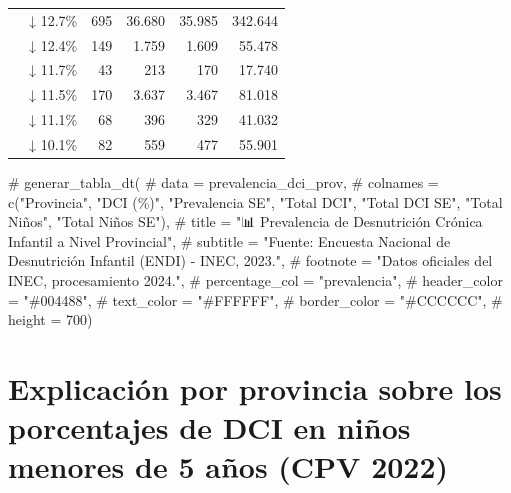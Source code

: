 \documentclass[
  letterpaper,
  DIV=11,
  numbers=noendperiod]{scrreprt}
\newenvironment{Shaded}{\begin{snugshade}}{\end{snugshade}}
\newcommand{\CommentTok}[1]{\textcolor[rgb]{0.37,0.37,0.37}{#1}}
\begin{document}
\begin{table}
\begin{tabular*}{\linewidth}{@{\extracolsep{\fill}}lrrrrr}
{\cellcolor[HTML]{E0F7FA}{GUAYAS}} & ↓ 12.7\% & 695 & 36.680 & 35.985 & 342.644 \\ 
{\cellcolor[HTML]{E0F7FA}{ESMERALDAS}} & ↓ 12.4\% & 149 & 1.759 & 1.609 & 55.478 \\ 
{\cellcolor[HTML]{E0F7FA}{SUCUMBÍOS}} & ↓ 11.7\% & 43 & 213 & 170 & 17.740 \\ 
{\cellcolor[HTML]{E0F7FA}{LOS RÍOS}} & ↓ 11.5\% & 170 & 3.637 & 3.467 & 81.018 \\ 
{\cellcolor[HTML]{E0F7FA}{SANTO DOMINGO DE LOS TSÁCHILAS}} & ↓ 11.1\% & 68 & 396 & 329 & 41.032 \\ 
{\cellcolor[HTML]{E0F7FA}{EL ORO}} & ↓ 10.1\% & 82 & 559 & 477 & 55.901 \\ 
\bottomrule
\end{tabular*}
\end{table}

\begin{Shaded}
\begin{Highlighting}[]
\CommentTok{\# generar\_tabla\_dt(}
\CommentTok{\#   data = prevalencia\_dci\_prov,}
\CommentTok{\#   colnames = c("Provincia", "DCI (\%)", "Prevalencia SE", "Total DCI", "Total DCI SE", "Total Niños", "Total Niños SE"),}
\CommentTok{\#   title = "📊 Prevalencia de Desnutrición Crónica Infantil a Nivel Provincial",}
\CommentTok{\#   subtitle = "Fuente: Encuesta Nacional de Desnutrición Infantil (ENDI) {-} INEC, 2023.",}
\CommentTok{\#   footnote = "Datos oficiales del INEC, procesamiento 2024.",}
\CommentTok{\#   percentage\_col = "prevalencia",}
\CommentTok{\#   header\_color = "\#004488",}
\CommentTok{\#   text\_color = "\#FFFFFF",}
\CommentTok{\#   border\_color = "\#CCCCCC",}
\CommentTok{\#   height = 700)}
\end{Highlighting}
\end{Shaded}

\chapter{Explicación por provincia sobre los porcentajes de DCI en niños
menores de 5 años (CPV
2022)}\label{explicaciuxf3n-por-provincia-sobre-los-porcentajes-de-dci-en-niuxf1os-menores-de-5-auxf1os-cpv-2022}
\end{document}

